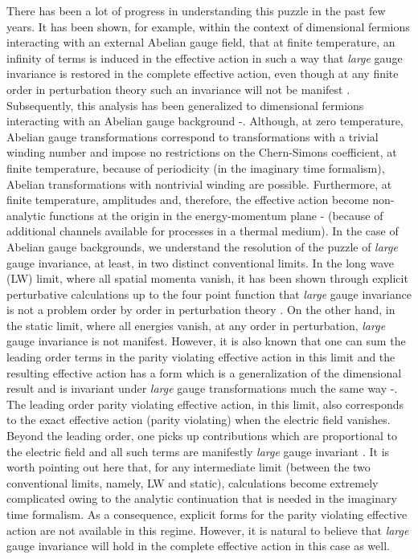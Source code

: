 \documentclass[a4paper,12pt]{article}
\begin{document}
There has been a lot of progress in understanding this puzzle in the
past few years. It has been shown, for example, within the context of
\coordHE{} dimensional fermions interacting with an external Abelian gauge
field, that at finite temperature, an infinity of terms is induced in
the effective action \cite{dunne:1997yb} in such a way that {\it
  large}  gauge invariance is
restored in the complete effective action, even though at any finite
order in perturbation theory such an invariance will not be
manifest \cite{dunne:1997yb,das:1998gg}.
Subsequently, this analysis has been generalized to \coordHE{}
dimensional fermions interacting with an Abelian gauge
background \cite{deser:1997nv}-\cite{fosco:1997vu}.
Although, at zero temperature, Abelian gauge
transformations correspond to transformations with a trivial winding
number and impose no restrictions on the Chern-Simons coefficient, at
finite  temperature, because of periodicity (in the imaginary time
formalism), Abelian transformations with nontrivial winding are
possible. Furthermore, at finite temperature, amplitudes and,
therefore, the effective action become non-analytic functions at the
origin in the energy-momentum plane \cite{weldon:1993bv}-\cite{das:book97}
(because of additional channels
available for processes in a thermal medium). In the case of Abelian
gauge backgrounds, we
understand  the resolution of the puzzle of {\it large} gauge
invariance, at least, in two distinct conventional limits. In the long
wave (LW) limit, where all spatial momenta vanish, it has been shown
through explicit perturbative calculations up to the four point
function that  {\it large} gauge invariance is not a problem order by
order in perturbation theory \cite{Brandt:2000dd}.  On the other
hand, in the static limit, where all energies vanish, at any order in
perturbation, {\it large} gauge invariance is not manifest. However,
it is also known that one can sum the leading order terms in the
parity violating effective action in this
limit and the resulting effective action has a form
which is a generalization of the \coordHE{} dimensional result and is
invariant under {\it large} gauge transformations much the same
way \cite{deser:1997nv}-\cite{fosco:1997vu}.
The leading order parity violating effective action, in this limit, also
corresponds to the exact effective action (parity violating) when the
electric field vanishes. Beyond the leading order, one picks up contributions which
are proportional to the electric field and all such terms are
manifestly {\it large} gauge invariant \cite{Brandt:2001jc}. 
It is worth pointing out here that, for any intermediate limit 
(between the two conventional limits, namely, LW and static), 
calculations become extremely complicated owing to the analytic 
continuation that is needed in the imaginary
time formalism. As a consequence, explicit forms for the parity
violating effective action are not available in this regime. However,
it is natural to believe that {\it large} gauge invariance will hold
in the complete effective action in this case as well.
\end{document}

